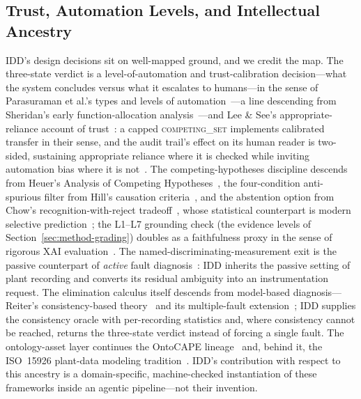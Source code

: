 \documentclass[preprint,10pt]{elsarticle}
\begin{document}
\subsection{Trust, Automation Levels, and Intellectual Ancestry}\label{sec:trust}
IDD's design decisions sit on well-mapped ground, and we credit the map. The three-state verdict is a level-of-automation and trust-calibration decision---what the system concludes versus what it escalates to humans---in the sense of Parasuraman et al.'s types and levels of automation~\cite{parasuraman2000model}---a line descending from Sheridan's early function-allocation analysis~\cite{sheridan1978human}---and Lee \& See's appropriate-reliance account of trust~\cite{lee2004trust}: a capped \mbox{\textsc{competing\_set}} implements calibrated transfer in their sense, and the audit trail's effect on its human reader is two-sided, sustaining appropriate reliance where it is checked while inviting automation bias where it is not~\cite{parasuraman2010complacency,bainbridge1983ironies}. The competing-hypotheses discipline descends from Heuer's Analysis of Competing Hypotheses~\cite{heuer1999psychology}, the four-condition anti-spurious filter from Hill's causation criteria~\cite{hill1965environment}, and the abstention option from Chow's recognition-with-reject tradeoff~\cite{chow1970optimum}, whose statistical counterpart is modern selective prediction~\cite{angelopoulos2023conformal}; the L1--L7 grounding check (the evidence levels of Section~\ref{sec:method-grading}) doubles as a faithfulness proxy in the sense of rigorous XAI evaluation~\cite{doshivelez2017rigorous}. The named-discriminating-measurement exit is the passive counterpart of \emph{active} fault diagnosis~\cite{scott2014input}: IDD inherits the passive setting of plant recording and converts its residual ambiguity into an instrumentation request. The elimination calculus itself descends from model-based diagnosis---Reiter's consistency-based theory~\cite{reiter1987theory} and its multiple-fault extension~\cite{dekleer1987diagnosing}; IDD supplies the consistency oracle with per-recording statistics and, where consistency cannot be reached, returns the three-state verdict instead of forcing a single fault. The ontology-asset layer continues the OntoCAPE lineage~\cite{morbach2009ontocape} and, behind it, the ISO~15926 plant-data modeling tradition~\cite{iso15926}. IDD's contribution with respect to this ancestry is a domain-specific, machine-checked instantiation of these frameworks inside an agentic pipeline---not their invention.
\end{document}
